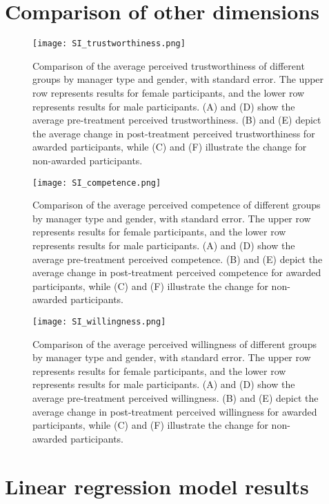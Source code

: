 \clearpage
\section*{Comparison of other dimensions}

\begin{figure}[htbp] 
    \centering
    \texttt{[image: SI\_trustworthiness.png]} 
    \caption{Comparison of the average perceived trustworthiness of different groups by manager type and gender, with standard error. 
    The upper row represents results for female participants, and the lower row represents results for male participants. (A) and (D) show the average pre-treatment perceived trustworthiness. (B) and (E) depict the average change in post-treatment perceived trustworthiness for awarded participants, while (C) and (F) illustrate the change for non-awarded participants.} 
    \label{fig:trust} 
\end{figure} 

\begin{figure}[htbp] 
    \centering
    \texttt{[image: SI\_competence.png]} 
    \caption{Comparison of the average perceived competence of different groups by manager type and gender, with standard error. 
    The upper row represents results for female participants, and the lower row represents results for male participants. (A) and (D) show the average pre-treatment perceived competence. (B) and (E) depict the average change in post-treatment perceived competence for awarded participants, while (C) and (F) illustrate the change for non-awarded participants.
    } 
    \label{fig:competence} 
\end{figure} 

\begin{figure}[htbp] 
    \centering
    \texttt{[image: SI\_willingness.png]} 
    \caption{Comparison of the average perceived willingness of different groups by manager type and gender, with standard error. 
    The upper row represents results for female participants, and the lower row represents results for male participants. (A) and (D) show the average pre-treatment perceived willingness. (B) and (E) depict the average change in post-treatment perceived willingness for awarded participants, while (C) and (F) illustrate the change for non-awarded participants.
    } 
    \label{fig:willingness} 
\end{figure} 


\clearpage
\section*{Linear regression model results}

